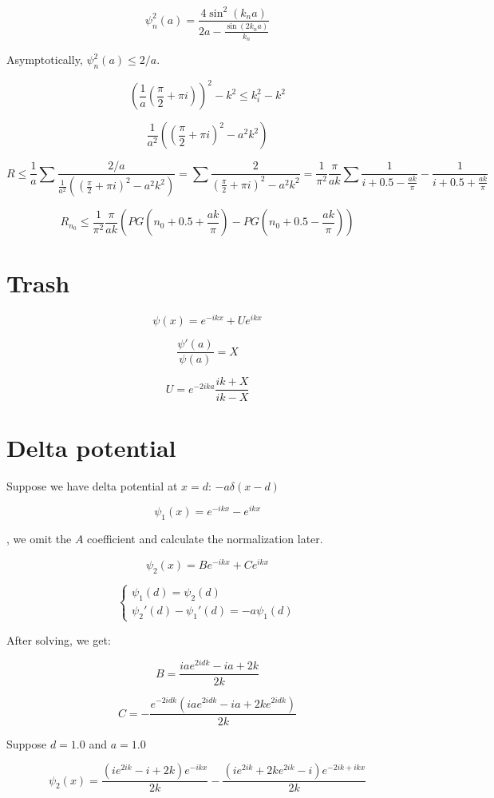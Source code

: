 \documentclass[12pt, a4paper]{article}
\begin{document}
$$\psi_n^2(a) = \frac{4 \sin^2(k_n a)}{2 a - \frac{\sin (2 k_n a)}{k_n}}$$

Asymptotically, $\psi_n^2(a) \le 2 / a$.


$$\left( \frac{1}{a} (\frac{\pi}{2} + \pi i) \right)^2 - k^2 \le k_i^2 - k^2$$

$$\frac{1}{a^2 } \left( (\frac{\pi}{2} + \pi i)^2 - a^2 k^2\right)$$

$$R \le \frac{1}{a} \sum \frac{2 / a}{\frac{1}{a^2 } \left( (\frac{\pi}{2} + \pi i)^2 - a^2 k^2\right)} = \sum \frac{2}{(\frac{\pi}{2} + \pi i)^2 - a^2 k^2} = \frac{1}{\pi^2} \frac{\pi}{ak} \sum \frac{1}{i + 0.5 - \frac{ak}{\pi}} - \frac{1}{i + 0.5 + \frac{ak}{\pi}}$$

$$R_{n_0} \le \frac{1}{\pi^2} \frac{\pi}{ak} (PG(n_0 + 0.5 + \frac{ak}{\pi}) - PG(n_0 + 0.5 - \frac{ak}{\pi}))$$



\section{Trash}
$$\psi(x) = e^{-ikx} + U e^{ikx}$$

$$\frac{\psi'(a)}{\psi(a)} = X$$

$$U = e^{-2 i k a} \frac{ik + X}{ik - X}$$

\section{Delta potential}

Suppose we have delta potential at $x = d$: $- a \delta(x - d)$

$$\psi_1(x) = e^{-i k x} - e^{i k x}$$ 

, we omit the $A$ coefficient and calculate the normalization later.

$$\psi_2(x) = B e^{-i k x} + C e^{i k x}$$

$$\begin{cases}
\psi_1(d) = \psi_2(d) \\
\psi_2'(d) - \psi_1'(d) = - a \psi_1(d) 
\end{cases}$$

After solving, we get:

$$B = \frac{i a e^{2 i d k}-i a+2 k}{2 k}$$

$$C = -\frac{e^{-2 i d k} \left(i a e^{2 i d k}-i a+2 k e^{2 i d k}\right)}{2 k}$$

Suppose $d = 1.0$ and $a = 1.0$

$$\psi_2(x) = \frac{\left(i e^{2 i k} - i+2 k\right) e^{-i k x}}{2 k}-\frac{\left(i e^{2 i k}+2 k e^{2 i k} -i\right) e^{-2 i k+i k x}}{2 k}$$
\end{document}
